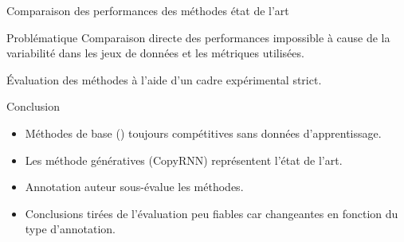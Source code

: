 \begin{frame}{Comparaison des performances des méthodes état de l'art}

    \begin{block}{Problématique}
    Comparaison directe des performances impossible à cause de la variabilité dans les jeux de données et les métriques utilisées.
    \end{block}
    
    \'Evaluation des méthodes à l'aide d'un cadre expérimental strict.

    \begin{block}{Conclusion}
    \begin{itemize}
        \item Méthodes de base (\tfidf{}) toujours compétitives sans données d'apprentissage.
        \item Les méthode génératives (CopyRNN) représentent l'état de l'art.
    \end{itemize}
    
    \begin{itemize}
        \item Annotation auteur sous-évalue les méthodes.
        \item Conclusions tirées de l'évaluation peu fiables car changeantes en fonction du type d'annotation.
    \end{itemize}
    \end{block}
    
    
\end{frame}